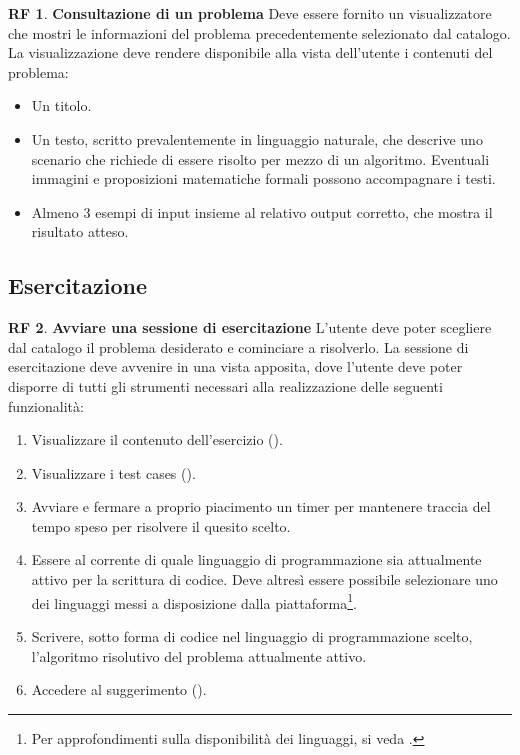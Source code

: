 \documentclass[11pt, a4paper]{article}
\theoremstyle{definition}
\newtheorem{funcreq}{RF} %
\begin{document}
\begin{funcreq}
\label{seeproblem}
\textbf{Consultazione di un problema }
Deve essere fornito un visualizzatore che mostri le informazioni del
problema precedentemente selezionato dal catalogo. La visualizzazione
deve rendere disponibile alla vista dell'utente i contenuti del
problema:
\begin{itemize}
    \item Un titolo.

    \item Un testo, scritto prevalentemente in linguaggio naturale,
    che descrive uno scenario che richiede di essere risolto per mezzo
    di un algoritmo. Eventuali immagini e proposizioni matematiche
    formali possono accompagnare i testi.

    \item Almeno 3 esempi di input insieme al relativo output corretto,
    che mostra il risultato atteso.
\end{itemize}
\end{funcreq}

\subsection{Esercitazione}
\begin{funcreq}
\label{exesession}
\textbf{Avviare una sessione di esercitazione }
L'utente deve poter scegliere dal catalogo il problema desiderato e cominciare
a risolverlo. La sessione di esercitazione deve avvenire in una vista apposita, dove
l'utente deve poter disporre di tutti gli strumenti necessari alla realizzazione
delle seguenti funzionalità:
\begin{enumerate}
    \item Visualizzare il contenuto dell'esercizio (\textcolor{blue}{}).
    
    \item Visualizzare i test cases (\textcolor{blue}{}).

    \item Avviare e fermare a proprio piacimento un timer per mantenere traccia
    del tempo speso per risolvere il quesito scelto.
    
    \item Essere al corrente di quale linguaggio di programmazione sia
    attualmente attivo per la scrittura di codice. Deve altresì essere 
    possibile selezionare uno dei linguaggi messi a disposizione dalla
    piattaforma\footnote{Per approfondimenti sulla disponibilità dei
    linguaggi, si veda \textcolor{blue}{}.}.

    \item Scrivere, sotto forma di codice nel linguaggio di programmazione
    scelto, l'algoritmo risolutivo del problema attualmente attivo.

    \item Accedere al suggerimento (\textcolor{blue}{}).
\end{enumerate}
\end{funcreq}
\end{document}
